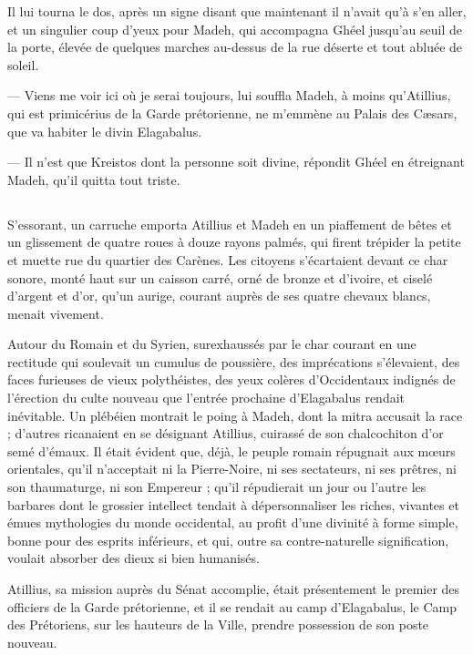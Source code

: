 \documentclass[a4paper, 11pt, oneside, polutonikogreek, french]{article}
\begin{document}
Il lui tourna le dos, après un signe disant que maintenant il n'avait qu'à s'en aller, et un singulier coup d'yeux pour Madeh, qui accompagna Ghéel jusqu'au seuil de la porte, élevée de quelques marches au-dessus de la rue déserte et tout abluée de soleil.

--- Viens me voir ici où je serai toujours, lui souffla Madeh, à moins qu'Atillius, qui est primicérius de la Garde prétorienne, ne m'emmène au Palais des Cæsars, que va habiter le divin Elagabalus.

--- Il n'est que Kreistos dont la personne soit divine, répondit Ghéel en étreignant Madeh, qu'il quitta tout triste.
\clearpage
\subsection{}
\paragraph{}
S'essorant, un carruche emporta Atillius et Madeh en un piaffement de bêtes et un glissement de quatre roues à douze rayons palmés, qui firent trépider la petite et muette rue du quartier des Carènes. Les citoyens s'écartaient devant ce char sonore, monté haut sur un caisson carré, orné de bronze et d'ivoire, et ciselé d'argent et d'or, qu'un aurige, courant auprès de ses quatre chevaux blancs, menait vivement.

Autour du Romain et du Syrien, surexhaussés par le char courant en une rectitude qui soulevait un cumulus de poussière, des imprécations s'élevaient, des faces furieuses de vieux polythéistes, des yeux colères d'Occidentaux indignés de l'érection du culte nouveau que l'entrée prochaine d'Elagabalus rendait inévitable. Un plébéien montrait le poing à Madeh, dont la mitra accusait la race ; d'autres ricanaient en se désignant Atillius, cuirassé de son chalcochiton d'or semé d'émaux. Il était évident que, déjà, le peuple romain répugnait aux mœurs orientales, qu'il n'acceptait ni la Pierre-Noire, ni ses sectateurs, ni ses prêtres, ni son thaumaturge, ni son Empereur ; qu'il répudierait un jour ou l'autre les barbares dont le grossier intellect tendait à dépersonnaliser les riches, vivantes et émues mythologies du monde occidental, au profit d'une divinité à forme simple, bonne pour des esprits inférieurs, et qui, outre sa contre-naturelle signification, voulait absorber des dieux si bien humanisés.

Atillius, sa mission auprès du Sénat accomplie, était présentement le premier des officiers de la Garde prétorienne, et il se rendait au camp d'Elagabalus, le Camp des Prétoriens, sur les hauteurs de la Ville, prendre possession de son poste nouveau.
\end{document}
